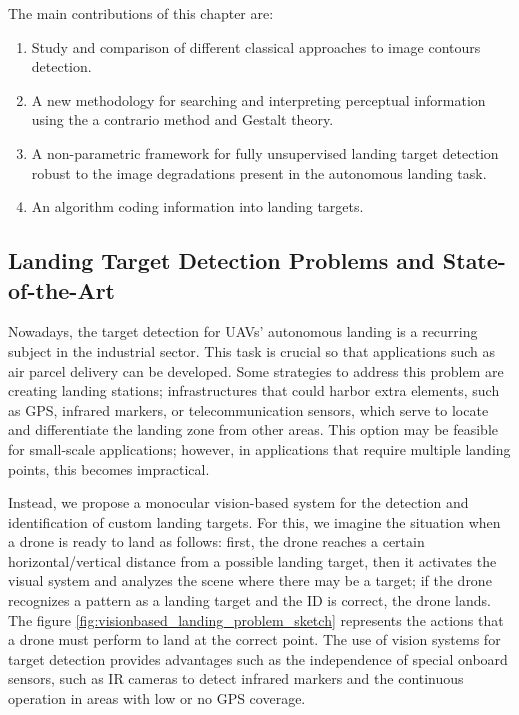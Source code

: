 The main contributions of this chapter are:

\begin{enumerate}
	\item Study and comparison of different classical approaches to image contours detection.
	\item A new methodology for searching and interpreting perceptual information using the a contrario method and Gestalt theory.
	\item A non-parametric framework for fully unsupervised landing target detection robust to the image degradations present in the autonomous landing task.
	\item An algorithm coding information into landing targets.

\end{enumerate}

\subsection{Landing Target Detection Problems and State-of-the-Art}
Nowadays, the target detection for UAVs' autonomous landing is a recurring subject in the industrial sector. This task is crucial so that applications such as air parcel delivery can be developed. Some strategies to address this problem are creating landing stations; infrastructures that could harbor extra elements, such as GPS, infrared markers, or telecommunication sensors, which serve to locate and differentiate the landing zone from other areas. This option may be feasible for small-scale applications; however, in applications that require multiple landing points, this becomes impractical.

Instead, we propose a monocular vision-based system for the detection and identification of custom landing targets. For this, we imagine the situation when a drone is ready to land as follows: first, the drone reaches a certain horizontal/vertical distance from a possible landing target, then it activates the visual system and analyzes the scene where there may be a target; if the drone recognizes a pattern as a landing target and the ID is correct, the drone lands. The figure \ref{fig:visionbased_landing_problem_sketch} represents the actions that a drone must perform to land at the correct point. The use of vision systems for target detection provides advantages such as the independence of special onboard sensors, such as IR cameras to detect infrared markers and the continuous operation in areas with low or no GPS coverage.

